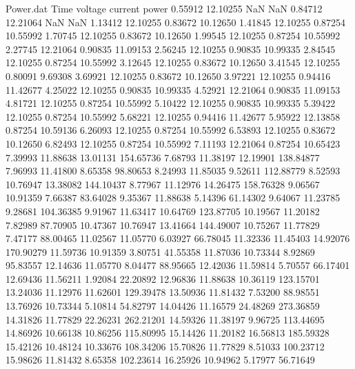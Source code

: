 \begin{filecontents}{Power.dat}
Time voltage current power
   0.55912   12.10255        NaN        NaN
   0.84712   12.21064        NaN        NaN
   1.13412   12.10255    0.83672   10.12650
   1.41845   12.10255    0.87254   10.55992
   1.70745   12.10255    0.83672   10.12650
   1.99545   12.10255    0.87254   10.55992
   2.27745   12.21064    0.90835   11.09153
   2.56245   12.10255    0.90835   10.99335
   2.84545   12.10255    0.87254   10.55992
   3.12645   12.10255    0.83672   10.12650
   3.41545   12.10255    0.80091    9.69308
   3.69921   12.10255    0.83672   10.12650
   3.97221   12.10255    0.94416   11.42677
   4.25022   12.10255    0.90835   10.99335
   4.52921   12.21064    0.90835   11.09153
   4.81721   12.10255    0.87254   10.55992
   5.10422   12.10255    0.90835   10.99335
   5.39422   12.10255    0.87254   10.55992
   5.68221   12.10255    0.94416   11.42677
   5.95922   12.13858    0.87254   10.59136
   6.26093   12.10255    0.87254   10.55992
   6.53893   12.10255    0.83672   10.12650
   6.82493   12.10255    0.87254   10.55992
   7.11193   12.21064    0.87254   10.65423
   7.39993   11.88638   13.01131  154.65736
   7.68793   11.38197   12.19901  138.84877
   7.96993   11.41800    8.65358   98.80653
   8.24993   11.85035    9.52611  112.88779
   8.52593   10.76947   13.38082  144.10437
   8.77967   11.12976   14.26475  158.76328
   9.06567   10.91359    7.66387   83.64028
   9.35367   11.88638    5.14396   61.14302
   9.64067   11.23785    9.28681  104.36385
   9.91967   11.63417   10.64769  123.87705
  10.19567   11.20182    7.82989   87.70905
  10.47367   10.76947   13.41664  144.49007
  10.75267   11.77829    7.47177   88.00465
  11.02567   11.05770    6.03927   66.78045
  11.32336   11.45403   14.92076  170.90279
  11.59736   10.91359    3.80751   41.55358
  11.87036   10.73344    8.92869   95.83557
  12.14636   11.05770    8.04477   88.95665
  12.42036   11.59814    5.70557   66.17401
  12.69436   11.56211    1.92084   22.20892
  12.96836   11.88638   10.36119  123.15701
  13.24036   11.12976   11.62601  129.39478
  13.50936   11.81432    7.53200   88.98551
  13.76926   10.73344    5.10814   54.82797
  14.04426   11.16579   24.48269  273.36859
  14.31826   11.77829   22.26231  262.21201
  14.59326   11.38197    9.96725  113.44695
  14.86926   10.66138   10.86256  115.80995
  15.14426   11.20182   16.56813  185.59328
  15.42126   10.48124   10.33676  108.34206
  15.70826   11.77829    8.51033  100.23712
  15.98626   11.81432    8.65358  102.23614
  16.25926   10.94962    5.17977   56.71649

\end{filecontents}
